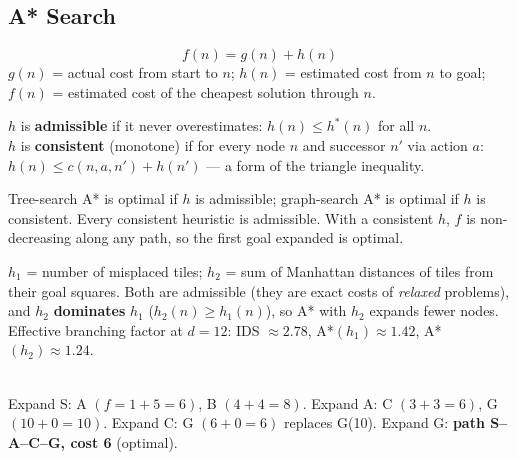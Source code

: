 \subsection{A* Search}
\[ f(n) = g(n) + h(n) \]
$g(n)$ = actual cost from start to $n$; $h(n)$ = estimated cost from $n$ to goal; $f(n)$ = estimated cost of the cheapest solution through $n$.

\begin{definition}
$h$ is \textbf{admissible} if it never overestimates: $h(n)\le h^{*}(n)$ for all $n$.\\
$h$ is \textbf{consistent} (monotone) if for every node $n$ and successor $n'$ via action $a$: $h(n)\le c(n,a,n')+h(n')$ --- a form of the triangle inequality.
\end{definition}
\begin{keypoint}[Optimality of A*]
Tree-search A* is optimal if $h$ is admissible; graph-search A* is optimal if $h$ is consistent. Every consistent heuristic is admissible. With a consistent $h$, $f$ is non-decreasing along any path, so the first goal expanded is optimal.
\end{keypoint}

\begin{example}
$h_1$ = number of misplaced tiles; $h_2$ = sum of Manhattan distances of tiles from their goal squares. Both are admissible (they are exact costs of \emph{relaxed} problems), and $h_2$ \textbf{dominates} $h_1$ ($h_2(n)\ge h_1(n)$), so A* with $h_2$ expands fewer nodes. Effective branching factor at $d=12$: IDS $\approx 2.78$, A*$(h_1)\approx1.42$, A*$(h_2)\approx1.24$.
\end{example}

\begin{example}
\small
{}\\
Expand S: A $(f=1+5=6)$, B $(4+4=8)$. Expand A: C $(3+3=6)$, G $(10+0=10)$. Expand C: G $(6+0=6)$ replaces G(10). Expand G: \textbf{path S--A--C--G, cost 6} (optimal).
\end{example}

